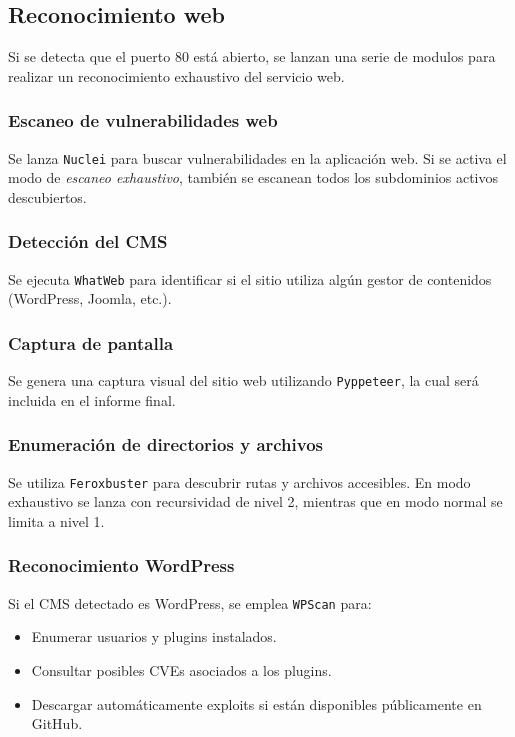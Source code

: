 \begin{parskipenv}
\subsection{Reconocimiento web}
Si se detecta que el puerto 80 está abierto, se lanzan una serie de modulos para realizar un reconocimiento exhaustivo del servicio web.

\subsubsection*{Escaneo de vulnerabilidades web}
Se lanza \texttt{Nuclei} para buscar vulnerabilidades en la aplicación web. Si se activa el modo de \textit{escaneo exhaustivo}, también se escanean todos los subdominios activos descubiertos.

\subsubsection*{Detección del CMS}
Se ejecuta \texttt{WhatWeb} para identificar si el sitio utiliza algún gestor de contenidos (WordPress, Joomla, etc.).

\subsubsection*{Captura de pantalla}
Se genera una captura visual del sitio web utilizando \texttt{Pyppeteer}, la cual será incluida en el informe final.

\subsubsection*{Enumeración de directorios y archivos}
Se utiliza \texttt{Feroxbuster} para descubrir rutas y archivos accesibles. En modo exhaustivo se lanza con recursividad de nivel 2, mientras que en modo normal se limita a nivel 1.

\subsubsection*{Reconocimiento WordPress}
Si el CMS detectado es WordPress, se emplea \texttt{WPScan} para:
\begin{itemize}
  \item Enumerar usuarios y plugins instalados.
  \item Consultar posibles CVEs asociados a los plugins.
  \item Descargar automáticamente exploits si están disponibles públicamente en GitHub.
\end{itemize}


\end{parskipenv}

